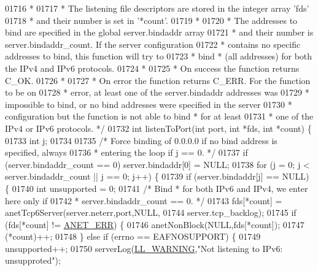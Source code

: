 \begin{DoxyCode}
{{{{{{{{{{{{{{{{{{{{{{{{{01716 \textcolor{comment}{ *}
01717 \textcolor{comment}{ * The listening file descriptors are stored in the integer array 'fds'}
01718 \textcolor{comment}{ * and their number is set in '*count'.}
01719 \textcolor{comment}{ *}
01720 \textcolor{comment}{ * The addresses to bind are specified in the global server.bindaddr array}
01721 \textcolor{comment}{ * and their number is server.bindaddr\_count. If the server configuration}
01722 \textcolor{comment}{ * contains no specific addresses to bind, this function will try to}
01723 \textcolor{comment}{ * bind * (all addresses) for both the IPv4 and IPv6 protocols.}
01724 \textcolor{comment}{ *}
01725 \textcolor{comment}{ * On success the function returns C\_OK.}
01726 \textcolor{comment}{ *}
01727 \textcolor{comment}{ * On error the function returns C\_ERR. For the function to be on}
01728 \textcolor{comment}{ * error, at least one of the server.bindaddr addresses was}
01729 \textcolor{comment}{ * impossible to bind, or no bind addresses were specified in the server}
01730 \textcolor{comment}{ * configuration but the function is not able to bind * for at least}
01731 \textcolor{comment}{ * one of the IPv4 or IPv6 protocols. */}
01732 \textcolor{keywordtype}{int} listenToPort(\textcolor{keywordtype}{int} port, \textcolor{keywordtype}{int} *fds, \textcolor{keywordtype}{int} *count) \{
01733     \textcolor{keywordtype}{int} j;
01734 
01735     \textcolor{comment}{/* Force binding of 0.0.0.0 if no bind address is specified, always}
01736 \textcolor{comment}{     * entering the loop if j == 0. */}
01737     \textcolor{keywordflow}{if} (server.bindaddr\_count == 0) server.bindaddr[0] = NULL;
01738     \textcolor{keywordflow}{for} (j = 0; j < server.bindaddr\_count || j == 0; j++) \{
01739         \textcolor{keywordflow}{if} (server.bindaddr[j] == NULL) \{
01740             \textcolor{keywordtype}{int} unsupported = 0;
01741             \textcolor{comment}{/* Bind * for both IPv6 and IPv4, we enter here only if}
01742 \textcolor{comment}{             * server.bindaddr\_count == 0. */}
01743             fds[*count] = anetTcp6Server(server.neterr,port,NULL,
01744                 server.tcp\_backlog);
01745             \textcolor{keywordflow}{if} (fds[*count] != \hyperlink{anet_8h_a0697b7774a7e0f4ef141839fe93536fe}{ANET\_ERR}) \{
01746                 anetNonBlock(NULL,fds[*count]);
01747                 (*count)++;
01748             \} \textcolor{keywordflow}{else} \textcolor{keywordflow}{if} (errno == EAFNOSUPPORT) \{
01749                 unsupported++;
01750                 serverLog(\hyperlink{server_8h_a31229b9334bba7d6be2a72970967a14b}{LL\_WARNING},\textcolor{stringliteral}{"Not listening to IPv6: unsupproted"});
}}}}}}}}}}}}}}}}}}}}}}}}}
\end{DoxyCode}
